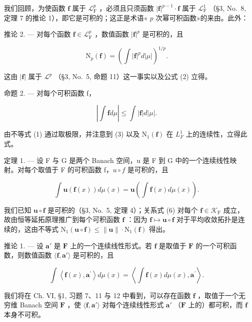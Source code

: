 我们回顾，为使函数 \(\mathbf{f}\) 属于 \(\mathcal{L}_{\mathrm{F}}^{p}\) ，必须且只须函数 \(|\mathbf{f}|^{p - 1}\cdot \mathbf{f}\) 属于 \(\mathcal{L}_{\mathrm{F}}^{1}\) （§3, No.~8, 定理 7 的推论 1），即它是可积的；这正是术语« \(p\) 次幂可积函数»的来由。此外：

推论 2. --- 对每个函数 \(\mathbf{f} \in \mathcal{L}_{\mathrm{F}}^{p}\) ，数值函数 \(|\mathbf{f}|^{p}\) 是可积的，且

\[
\mathrm{N} _ {p} (\mathbf {f}) = \left(\int | \mathbf {f} | ^ {p} d | \mu |\right) ^ {1 / p}.\tag{4}
\]

这由 \(|\mathbf{f}|\) 属于 \(\mathcal{L}^p\) （§3, No.~5, 命题 11）这一事实以及公式 (2) 立得。

命题 2. --- 对每个可积函数 f，

\[
\left| \int \mathbf {f} d \mu \right| \leqslant \int | \mathbf {f} | d | \mu |.\tag{5}
\]

由不等式 (1) 通过取极限，并注意到 (3) 以及 \(\mathrm{N}_{1}(\mathbf{f})\) 在 \(L_{F}^{1}\) 上的连续性，立得此式。

定理 1. --- 设 F 与 G 是两个 Banach 空间，u 是 F 到 G 中的一个连续线性映射。对每个取值于 F 的可积函数 f，\(u \circ f\) 是可积的，且

\[
\int \mathbf {u} (\mathbf {f} (x)) d \mu (x) = \mathbf {u} \left(\int \mathbf {f} (x) d \mu (x)\right).\tag{6}
\]

我们已知 \(\mathbf{u} \circ \mathbf{f}\) 是可积的（§3, No.~5, 定理 4）；关系式 (6) 对每个 \(\mathbf{f} \in \mathcal{K}_{\mathrm{F}}\) 成立，故由恒等延拓原理推广到每个可积函数 \(\mathbf{f}\) ：因为 \(\mathbf{f} \mapsto \mathbf{u} \circ \mathbf{f}\) 对于平均收敛拓扑是连续的，这由不等式 \(\mathrm{N}_1(\mathbf{u} \circ \mathbf{f}) \leqslant \| \mathbf{u} \| \cdot \mathrm{N}_1(\mathbf{f})\) 得出。

推论 1. --- 设 \(\mathbf{a}'\) 是 \(\mathbf{F}\) 上的一个连续线性形式。若 \(\mathbf{f}\) 是取值于 \(\mathbf{F}\) 的一个可积函数，则数值函数 \(\langle \mathbf{f}, \mathbf{a}' \rangle\) 是可积的，且

\[
\int \left\langle \mathbf {f} (x), \mathbf {a} ^ {\prime} \right\rangle d \mu (x) = \left\langle \int \mathbf {f} (x) d \mu (x), \mathbf {a} ^ {\prime} \right\rangle .\tag{7}
\]

我们将在 Ch. VI, §1, 习题 7、11 与 12 中看到，可以存在函数 \(\mathbf{f}\) ，取值于一个无穷维 Banach 空间 \(\mathbf{F}\) ，使 \(\langle \mathbf{f}, \mathbf{a}' \rangle\) 对每个连续线性形式 \(\mathbf{a}'\) （\(\mathbf{F}\) 上的）都可积，而 \(\mathbf{f}\) 本身不可积。

